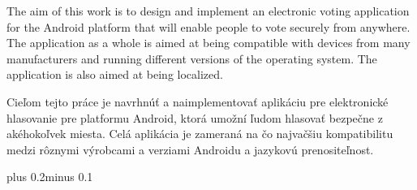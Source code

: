 \documentclass[11pt,twoside,a4paper]{book}
\begin{document}



 
\abstractpage

The aim of this work is to design and implement an electronic voting application for the Android platform that will enable people to vote securely from anywhere. The application as a whole is aimed at being compatible with devices from many manufacturers and running different versions of the operating system. The application is also aimed at being localized.




\baselineskip

\noindent
 Cieľom tejto práce je navrhnúť a naimplementovať aplikáciu pre elektronické hlasovanie pre platformu Android, ktorá umožní ľudom hlasovať bezpečne z akéhokoľvek miesta. Celá aplikácia je zameraná na čo najvačšiu kompatibilitu medzi rôznymi výrobcami a verziami Androidu a jazykovú prenositeľnost.
 


\tableofcontents









\mainbodystarts
\normalfont
{}\baselineskip plus 0.2\baselineskip minus 0.1\baselineskip

\end{document}
